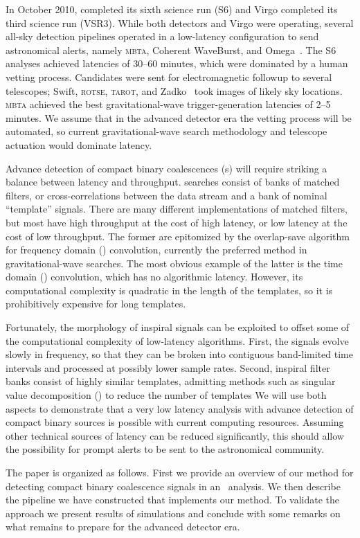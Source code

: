 In October 2010, \LIGO{} completed its sixth science run
(S6) and Virgo completed its third science run (VSR3).  While both
\LIGO{} detectors and Virgo were operating, several all-sky detection
pipelines operated in a low-latency configuration to send astronomical alerts,
namely \textsc{mbta}, Coherent WaveBurst, and
Omega~\cite{HugheyGWPAW2011, S6lowlatency}.
 The S6 analyses
achieved latencies of 30--60 minutes, which were dominated by a human vetting
process. Candidates were sent for electromagnetic followup to several
telescopes; Swift, \textsc{rotse}, \textsc{tarot}, and Zadko~\cite{kanner2008,
HugheyGWPAW2011} took images of likely sky locations.  \textsc{mbta} achieved
the best gravitational-wave trigger-generation latencies of 2--5 minutes.  We
assume that in the advanced detector era the vetting process will be automated,
so current gravitational-wave search methodology and telescope actuation would
dominate latency.

Advance detection of compact binary coalescences (\CBC{}s) will require striking a balance between latency
and throughput.  \CBC{} searches consist of banks of matched filters, or
cross-correlations between the data stream and a bank of nominal ``template''
signals.  There are many different implementations of matched filters, but most
have high throughput at the cost of high latency, or low latency at the cost of
low throughput.  The former are epitomized by the overlap-save algorithm
\cite{numerical-recipes-chapter-13} for frequency domain (\FD) convolution,
currently the preferred method in gravitational-wave
searches.  The most obvious example of the latter is the time domain
(\TD) convolution, which has no algorithmic latency.  However, its
computational complexity is quadratic in the length of the templates, so it is
prohibitively expensive for long templates.

Fortunately, the morphology of inspiral signals can be exploited to offset some
of the computational complexity of low-latency algorithms.  First, the signals
evolve slowly in frequency, so that they can be broken into contiguous
band-limited time intervals and processed at possibly lower sample rates.
Second, inspiral filter banks consist of highly similar templates, admitting
methods such as singular value decomposition (\SVD{}) to reduce the number of templates\cite{Cannon:2010p10398}
We will use both aspects to demonstrate that a very
low latency analysis with advance detection of compact binary sources is
possible with current computing resources.  Assuming other technical sources of
latency can be reduced significantly, this should allow the possibility for
prompt alerts to be sent to the astronomical community.

The paper is organized as follows. First we provide an overview of our method
for detecting compact binary coalescence signals in an \earlywarning\ analysis.
We then describe the pipeline we have constructed that implements our method.
To validate the approach we present results of simulations and conclude with
some remarks on what remains to prepare for the advanced detector era.

